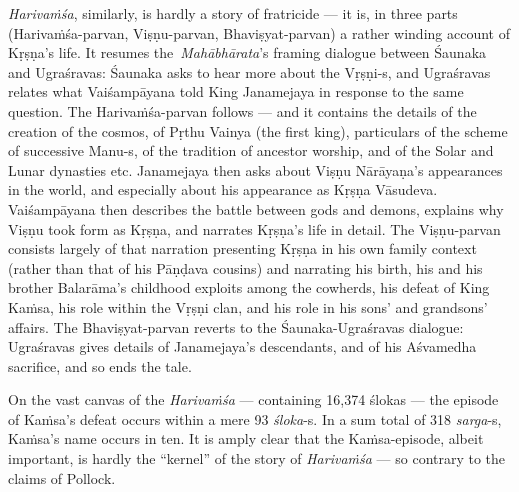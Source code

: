 {\sl Harivaṁśa}, similarly, is hardly a story of fratricide --- it is, in three parts (Harivaṁśa-parvan, Viṣṇu-parvan, Bhaviṣyat-parvan) a rather winding account of Kṛṣṇa’s life. It resumes the {\sl Mahābhārata}’s framing dialogue between Śaunaka and Ugraśravas: Śaunaka asks to hear more about the Vṛṣṇi-s, and Ugraśravas relates what Vaiśampāyana told King Janamejaya in response to the same question. The Harivaṁśa-parvan follows --- and it contains the details of the creation of the cosmos, of Pṛthu Vainya (the first king), particulars of the scheme of successive Manu-s, of the tradition of ancestor worship, and of the Solar and Lunar dynasties etc. Janamejaya then asks about Viṣṇu Nārāyaṇa’s appearances in the world, and especially about his appearance as Kṛṣṇa Vāsudeva. Vaiśampāyana then describes the battle between gods and demons, explains why Viṣṇu took form as Kṛṣṇa, and narrates Kṛṣṇa’s life in detail. The Viṣṇu-parvan consists largely of that narration presenting Kṛṣṇa in his own family context (rather than that of his Pāṇḍava cousins) and narrating his birth, his and his brother Balarāma’s childhood exploits among the cowherds, his defeat of King Kaṁsa, his role within the Vṛṣṇi clan, and his role in his sons’ and grandsons’ affairs. The Bhaviṣyat-parvan reverts to the Śaunaka-Ugraśravas dialogue: Ugraśravas gives details of Janamejaya’s descendants, and of his Aśvamedha sacrifice, and so ends the tale.

On the vast canvas of the {\sl Harivaṁśa} --- containing 16,374 ślokas --- the episode of Kaṁsa’s defeat occurs within a mere 93 {\sl śloka}-s. In a sum total of 318 {\sl sarga}-s, Kaṁsa’s name occurs in ten. It is amply clear that the Kaṁsa-episode, albeit important, is hardly the “kernel” of the story of {\sl Harivaṁśa} --- so contrary to the claims of Pollock. 

